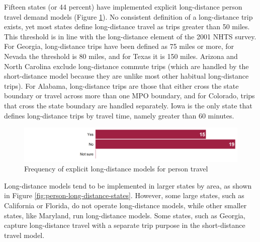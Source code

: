 Fifteen states (or 44 percent) have implemented explicit long-distance person travel demand models (Figure \ref{fig:person-long-distance-frequency}). No consistent definition of a long-distance trip exists, yet most states define long-distance travel as trips greater than 50 miles. This threshold is in line with the long-distance element of the 2001 NHTS survey. For Georgia, long-distance trips have been defined as 75 miles or more, for Nevada the threshold is 80 miles, and for Texas it is 150 miles. Arizona and North Carolina exclude long-distance commute trips (which are handled by the short-distance model because they are unlike most other habitual long-distance trips). For Alabama, long-distance trips are those that either cross the state boundary or travel across more than one MPO boundary, and for Colorado, trips that cross the state boundary are handled separately. Iowa is the only state that defines long-distance trips by travel time, namely greater than 60 minutes.

\begin{figure}   %
\centering
\includegraphics[width=6.4in]{graphics/16-person-long-distance-frequency}
\caption{Frequency of explicit long-distance models for person travel}
\label{fig:person-long-distance-frequency}
\end{figure}

Long-distance models tend to be implemented in larger states by area, as shown in Figure \ref{fig:person-long-distance-states}. However, some large states, such as California or Florida, do not operate long-distance models, while other smaller states, like Maryland, run long-distance models. Some states, such as Georgia, capture long-distance travel with a separate trip purpose in the short-distance travel model.

